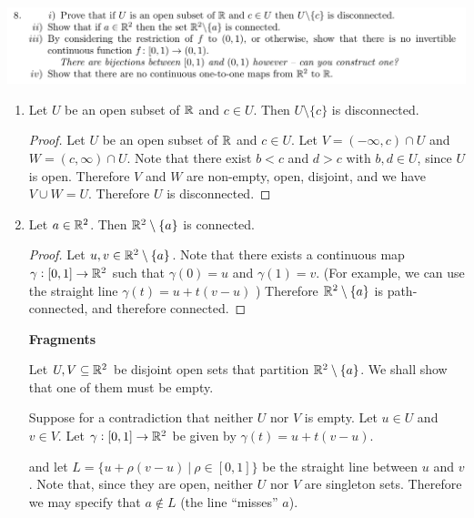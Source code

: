 \documentclass[12pt]{article}
\begin{document}
\begin{mdframed}
\includegraphics[width=400pt]{img/oxford-a2-2-8.png}
\end{mdframed}
\begin{enumerate}[label=(\roman*)]
\item
  \begin{claim*}
    Let $U$ be an open subset of $\mathbb{R}$ and $c \in U$. Then $U \setminus \{c\}$ is disconnected.
  \end{claim*}
  \begin{proof}
    Let $U$ be an open subset of $\mathbb{R}$ and $c \in U$. Let $V = (-\infty, c) \cap U$ and
    $W = (c, \infty) \cap U$. Note that there exist $b < c$ and $d > c$ with $b, d \in U$, since
    $U$ is open. Therefore $V$ and $W$ are non-empty, open, disjoint, and we have $V \cup W =
    U$. Therefore $U$ is disconnected.
  \end{proof}
\item

  \begin{claim*}
    Let $a \in \mathbb{R}^2$. Then $\mathbb{R}^2 \setminus \{a\}$ is connected.
  \end{claim*}
  \begin{proof}
    Let $u, v \in \mathbb{R}^2 \setminus \{a\}$. Note that there exists a continuous map
    $\gamma:[0, 1] \to \mathbb{R}^2$ such that $\gamma(0) = u$ and $\gamma(1) = v$. (For example, we can
    use the straight line $\gamma(t) = u + t(v - u)$ ) Therefore $\mathbb{R}^2 \setminus \{a\}$ is path-connected, and therefore
    connected.
  \end{proof}
  {\bf Fragments}\\
  \begin{mdframed}
    Let $U, V \subseteq \mathbb{R}^2$ be disjoint open sets that partition $\mathbb{R}^2 \setminus \{a\}$. We shall
    show that one of them must be empty.

    Suppose for a contradiction that neither $U$ nor $V$ is empty. Let $u \in U$ and $v \in V$. Let
    $\gamma:[0, 1] \to \mathbb{R}^2$ be given by $\gamma(t) = u + t(v - u)$.


    and
    let $L = \{u + \rho(v - u) ~|~ \rho \in [0, 1]\}$ be the straight line between $u$ and
    $v$. Note that, since they are open, neither $U$ nor $V$ are singleton sets. Therefore we may
    specify that $a \notin L$ (the line ``misses'' $a$).


\end{mdframed}
\end{enumerate}
\end{document}

